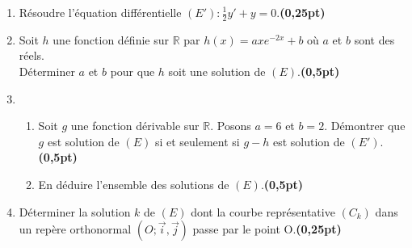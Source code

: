 \documentclass[12pt]{article}
\begin{document}
\renewcommand{\labelenumi}{\theenumi)}
\begin{enumerate}[label=\arabic*)]
    \item Résoudre l'équation différentielle $(E'):\frac{1}{2}y'+y=0$.\hfill \textbf{(0,25pt)}
    \item Soit $h$ une fonction définie sur $\mathbb{R}$ par $h(x)=axe^{-2x}+b$ où $a$ et $b$ sont  des réels.\\
        Déterminer $a$ et $b$ pour que $h$ soit une solution de $(E).$\hfill \textbf{(0,5pt)}
    \item
    \begin{enumerate}[label=\alph*)]
        \item Soit $g$ une fonction dérivable sur $\mathbb{R}.$ Posons $a=6$ et $b=2.$
        Démontrer que $g$ est solution de $(E)$ si et seulement si $g-h$ est solution  de $(E').$ \hfill \textbf{(0,5pt)}
        \item En déduire l'ensemble des solutions de $(E)$.\hfill \textbf{(0,5pt)}
    \end{enumerate}
    \item Déterminer la solution $k$ de $(E)$ dont la courbe représentative $(C_{k})$ dans un repère orthonormal $(O;\vec{i},\vec{j})$ passe par le point O.\hfill \textbf{(0,25pt)}
\end{enumerate}
\end{document}
